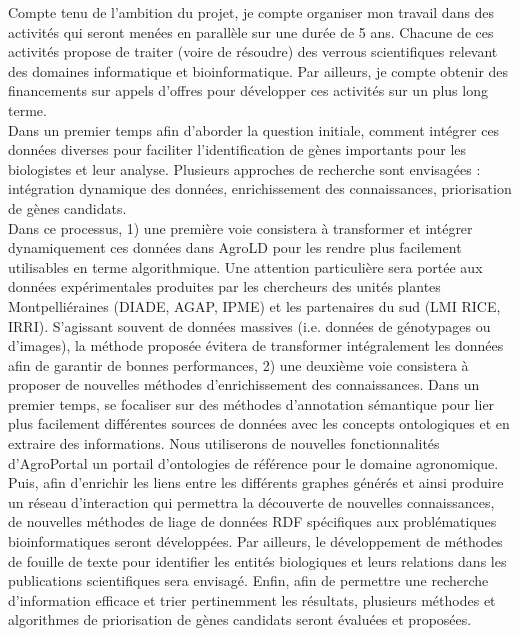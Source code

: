 Compte tenu de l’ambition du projet, je compte organiser mon travail dans des activités qui seront menées en parallèle sur une durée de 5 ans. Chacune de ces activités propose de traiter (voire de résoudre) des verrous scientifiques relevant des domaines informatique et bioinformatique. Par ailleurs, je compte obtenir des financements sur appels d’offres pour développer ces activités sur un plus long terme. \\

Dans un premier temps afin d'aborder la question initiale, comment intégrer ces données diverses pour faciliter l’identification de gènes importants pour les biologistes et leur analyse.
Plusieurs approches de recherche sont envisagées : intégration dynamique des données, enrichissement des connaissances, priorisation de gènes candidats.\\ 

Dans ce processus, 1) une première voie consistera à transformer et intégrer dynamiquement ces données dans AgroLD pour les rendre plus facilement utilisables en terme algorithmique. Une attention particulière sera portée aux données expérimentales produites par les chercheurs des unités plantes Montpelliéraines (DIADE, AGAP, IPME) et les partenaires du sud (LMI RICE, IRRI). S’agissant souvent de données massives (i.e. données de génotypages ou d’images), la méthode proposée évitera de transformer intégralement les données afin de garantir de bonnes performances, 2) une deuxième voie consistera à proposer de nouvelles méthodes d'enrichissement des connaissances. Dans un premier temps, se focaliser sur des méthodes d’annotation sémantique pour lier plus facilement différentes sources de données avec les concepts ontologiques et en extraire des informations. Nous utiliserons de nouvelles fonctionnalités d’AgroPortal un portail d'ontologies de référence pour le domaine agronomique. Puis, afin d'enrichir les liens entre les différents graphes générés et ainsi produire un réseau d’interaction qui permettra la découverte de nouvelles connaissances, de nouvelles méthodes de liage de données RDF spécifiques aux problématiques bioinformatiques seront développées. Par ailleurs, le développement de méthodes de fouille de texte pour identifier les entités biologiques et leurs relations dans les publications scientifiques sera envisagé.  Enfin, afin de permettre une recherche d’information efficace et trier pertinemment les résultats, plusieurs méthodes et algorithmes de priorisation de gènes candidats seront évaluées et proposées. \\



